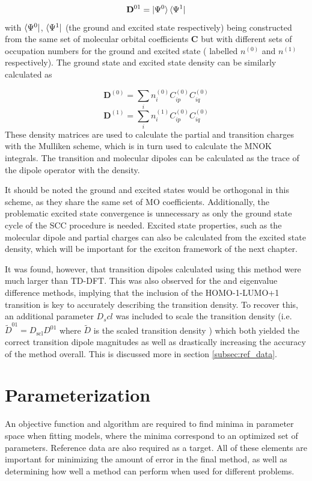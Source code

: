 \begin{equation}
\mathbf{D}^{01} = \ket{\Psi^0} \bra{\Psi^1} 
\end{equation}
%
with $\bra{\Psi^0}$, $\bra{\Psi^1}$ (the ground and excited state respectively)
being constructed from the same set of molecular orbital coefficients $\mathbf{C}$
but with different sets of occupation numbers for the ground and excited state (
labelled $n^{\left(0\right)}$ and $n^{\left(1\right)}$ respectively). The ground state
and excited state density can be similarly calculated as

\begin{equation}
\mathbf{D}^{\left(0\right)} = \sum_i n^{\left(0\right)}_i C^{\left(0\right)}_{ip} C^{\left(0\right)}_{iq}
\end{equation}
%
\begin{equation}
    \mathbf{D}^{\left(1\right)} = \sum_i n^{\left(1\right)}_i C^{\left(0\right)}_{ip} C^{\left(0\right)}_{iq} 
\end{equation}
%
These density matrices are used to calculate the partial and transition charges
with the Mulliken scheme, which is in turn used to calculate the MNOK integrals.
The transition and molecular dipoles can be calculated as the trace of the dipole
operator with the density.

It should be noted the ground and excited states would be orthogonal in this scheme,
as they share the same set of MO coefficients. Additionally, the problematic excited
state convergence is unnecessary as only the ground state cycle of the SCC procedure 
is needed. Excited state properties, such as the molecular dipole and partial charges 
can also be calculated from the excited state density, which will be important for 
the exciton framework of the next chapter.

It was found, however, that transition dipoles calculated using this method were
much larger than TD-DFT. This was also observed for the \dscf and eigenvalue
difference methods, implying that the inclusion of the HOMO-1-LUMO+1 transition
is key to accurately describing the transition density. To recover this, an additional
parameter $D_scl$ was included to scale the transition density (i.e. $\tilde{D}^{01} = D_{\text{scl}} D^{01}$ 
where $\tilde{D}$ is the scaled transition density ) which both yielded the correct
transition dipole magnitudes as well as drastically increasing the accuracy of the
method overall. This is discussed more in section \ref{subsec:ref_data}.

\afterpartskip
\section{Parameterization}
\label{sec:chl_params}
An objective function and algorithm are required to find minima in parameter space
when fitting models, where the minima correspond to an optimized set of parameters.
Reference data are also required as a target. All of these elements are important
for minimizing the amount of error in the final method, as well as determining how
well a method can perform when used for different problems.

